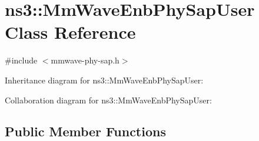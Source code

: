 \hypertarget{classns3_1_1MmWaveEnbPhySapUser}{}\section{ns3\+:\+:Mm\+Wave\+Enb\+Phy\+Sap\+User Class Reference}
\label{classns3_1_1MmWaveEnbPhySapUser}


{\ttfamily \#include $<$mmwave-\/phy-\/sap.\+h$>$}



Inheritance diagram for ns3\+:\+:Mm\+Wave\+Enb\+Phy\+Sap\+User\+:


Collaboration diagram for ns3\+:\+:Mm\+Wave\+Enb\+Phy\+Sap\+User\+:
\subsection*{Public Member Functions}
